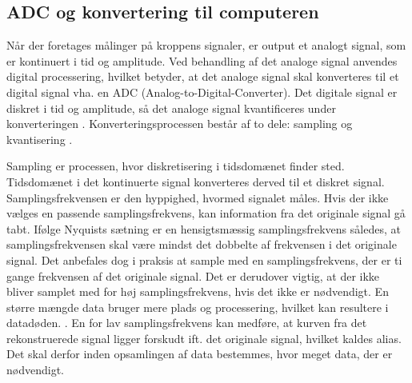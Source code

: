 \subsection{ADC og konvertering til computeren}\label{ADCafsnit}
Når der foretages målinger på kroppens signaler, er output et analogt signal, som er kontinuert i tid og amplitude. Ved behandling af det analoge signal anvendes digital processering, hvilket betyder, at det analoge signal skal konverteres til et digital signal vha. en ADC (Analog-to-Digital-Converter). Det digitale signal er diskret i tid og amplitude, så det analoge signal kvantificeres under konverteringen \cite{Webster2009}. Konverteringsprocessen består af to dele: sampling og kvantisering \cite{Zouridakis2003}.  

Sampling er processen, hvor diskretisering i tidsdomænet finder sted. Tidsdomænet i det kontinuerte signal konverteres derved til et diskret signal. Samplingsfrekvensen er den hyppighed, hvormed signalet måles. Hvis der ikke vælges en passende samplingsfrekvens, kan information fra det originale signal gå tabt. Ifølge Nyquists sætning er en hensigtsmæssig samplingsfrekvens således, at samplingsfrekvensen skal være mindst det dobbelte af frekvensen i det originale signal. \cite{Zouridakis2003} Det anbefales dog i praksis at sample med en samplingsfrekvens, der er ti gange frekvensen af det originale signal. Det er derudover vigtig, at der ikke bliver samplet med for høj samplingsfrekvens, hvis det ikke er nødvendigt. En større mængde data bruger mere plads og processering, hvilket kan resultere i datadøden. . En for lav samplingsfrekvens kan medføre, at kurven fra det rekonstruerede signal ligger forskudt ift. det originale signal, hvilket kaldes alias. \cite{Zouridakis2003} Det skal derfor inden opsamlingen af data bestemmes, hvor meget data, der er nødvendigt.

